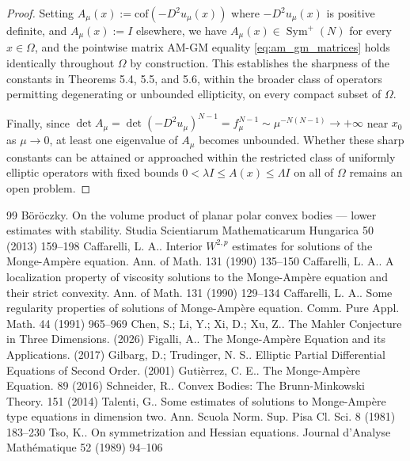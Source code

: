 \documentclass[10pt,a4paper]{amsart}
\numberwithin{equation}{section}
\begin{document}
\begin{proof}
\noindent Setting $A_\mu(x) := \mathrm{cof}(-D^2 u_\mu(x))$ where $-D^2u_\mu(x)$ is positive definite, and $A_\mu(x) := I$ elsewhere, we have $A_\mu(x)\in\operatorname{Sym}^+(N)$ for every $x\in\Omega$, and the pointwise matrix AM-GM equality \eqref{eq:am_gm_matrices} holds identically throughout $\Omega$ by construction. This establishes the sharpness of the constants in Theorems 5.4, 5.5, and 5.6, within the broader class of operators permitting degenerating or unbounded ellipticity, on every compact subset of $\Omega$.

\noindent Finally, since $\det A_\mu = \det(-D^2u_\mu)^{N-1} = f_\mu^{N-1} \sim \mu^{-N(N-1)} \to +\infty$ near $x_0$ as $\mu\to0$, at least one eigenvalue of $A_\mu$ becomes unbounded. Whether these sharp constants can be attained or approached within the restricted class of uniformly elliptic operators with fixed bounds $0<\lambda I\le A(x)\le\Lambda I$ on all of $\Omega$ remains an open problem.
\end{proof}


\begin{thebibliography}{99}
 B{\"{o}}r{\"{o}}czky. On the volume product of planar polar convex bodies — lower estimates with stability. Studia Scientiarum Mathematicarum Hungarica 50 (2013) 159--198
 Caffarelli, L. A.. Interior $W^{2,p}$ estimates for solutions of the {M}onge-{A}mp\`ere equation. Ann. of Math. 131 (1990) 135--150
 Caffarelli, L. A.. A localization property of viscosity solutions to the {M}onge-{A}mp\`ere equation and their strict convexity. Ann. of Math. 131 (1990) 129--134
 Caffarelli, L. A.. Some regularity properties of solutions of {M}onge-{A}mp\`ere equation. Comm. Pure Appl. Math. 44 (1991) 965--969
 Chen, S.; Li, Y.; Xi, D.; Xu, Z.. The {M}ahler {C}onjecture in {T}hree {D}imensions. (2026)
 Figalli, A.. The {M}onge-{A}mp{\`e}re Equation and its Applications. (2017)
 Gilbarg, D.; Trudinger, N. S.. Elliptic Partial Differential Equations of Second Order. (2001)
 Guti{\`e}rrez, C. E.. The {M}onge-{A}mp{\`e}re Equation. 89 (2016)
 Schneider, R.. Convex Bodies: The {B}runn-{M}inkowski Theory. 151 (2014)
 Talenti, G.. Some estimates of solutions to {M}onge-{A}mp{\`e}re type equations in dimension two. Ann. Scuola Norm. Sup. Pisa Cl. Sci. 8 (1981) 183--230
 Tso, K.. On symmetrization and {H}essian equations. Journal d'Analyse Math{\'{e}}matique 52 (1989) 94--106
\end{thebibliography}
\end{document}
